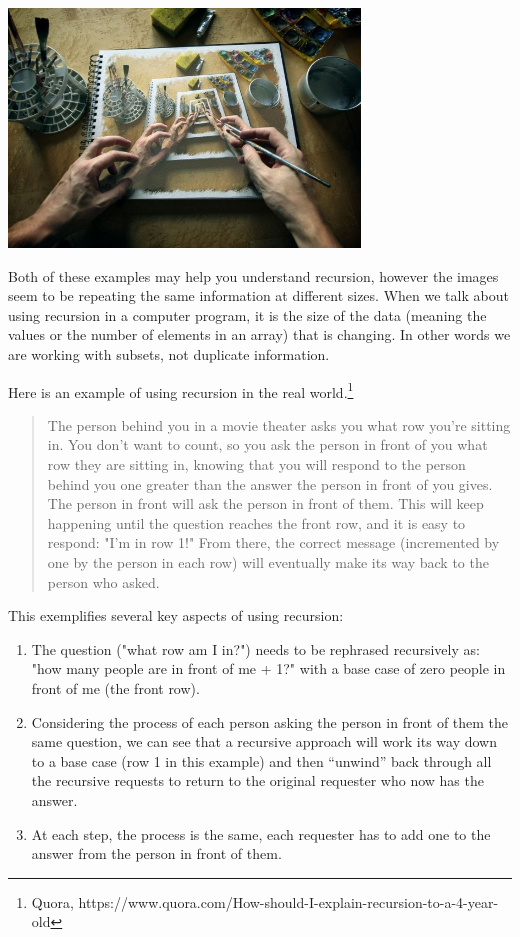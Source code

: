 \beforefig
\centerline{\includegraphics[height=2.5in]{images/recursion_quora.jpg}}
\afterfig

Both of these examples may help you understand recursion, however the images seem to be repeating the same information at different sizes. When we talk about using recursion in a computer program, it is the size of the data (meaning the values or the number of elements in an array) that is changing. In other words we are working with subsets, not duplicate information.

Here is an example of using recursion in the real world.\footnote{Quora, https://www.quora.com/How-should-I-explain-recursion-to-a-4-year-old} 

\begin{quotation}
The person behind you in a movie theater asks you what row you're sitting in. You don't want to count, so you ask the person in front of you what row they are sitting in, knowing that you will respond to the person behind you one greater than the answer the person in front of you gives. The person in front will ask the person in front of them. This will keep happening until the question reaches the front row, and it is easy to respond: "I'm in row 1!" From there, the correct message (incremented by one by the person in each row) will eventually make its way back to the person who asked.
\end{quotation}

\pagebreak

This exemplifies several key aspects of using recursion:
    
\begin{enumerate}
    \item The question ("what row am I in?") needs to be rephrased recursively as: "how many people are in front of me + 1?" with a base case of zero people in front of me (the front row).
    
    \item Considering the process of each person asking the person in front of them the same question, we can see that a recursive approach will work its way down to a base case (row 1 in this example) and then ``unwind'' back through all the recursive requests to return to the original requester who now has the answer.
    
    \item At each step, the process is the same, each requester has to add one to the answer from the person in front of them.
    
\end{enumerate}    
    

